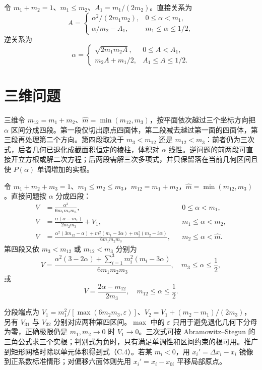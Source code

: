 \documentclass[11pt,a4paper,openany,fontset=none]{ctexbook}
\begin{document}
令 $m_1+m_2=1$、$m_1\le m_2$、$A_1=m_1/(2m_2)$。直接关系为
\begin{equation*}
 A=\begin{cases}
 \alpha^2/(2m_1m_2),&0\le\alpha<m_1,\\
 \alpha/m_2-A_1,&m_1\le\alpha\le1/2,
 \end{cases}
\end{equation*}
逆关系为
\begin{equation*}
 \alpha=\begin{cases}
 \sqrt{2m_1m_2A},&0\le A<A_1,\\
 m_2A+m_1/2,&A_1\le A\le1/2.
 \end{cases}
\end{equation*}

\section{三维问题}
三维令 $m_{12}=m_1+m_2$、$\widehat m=\min(m_{12},m_3)$，按平面依次越过三个坐标方向把 $\alpha$ 区间分成四段。第一段仅切出原点四面体，第二段减去越过第一面的四面体，第三段再处理第二个方向。第四段取决于 $m_3<m_{12}$ 还是 $m_{12}<m_3$：前者仍为三次式，后者几何已退化成截面积恒定的棱柱，体积对 $\alpha$ 线性。逆问题的前两段可直接开立方根或解二次方程；后两段需解三次多项式，并只保留落在当前几何区间且使 $P(\alpha)$ 单调增加的实根。


令 $m_1+m_2+m_3=1$、$m_1\le m_2\le m_3$，$m_{12}=m_1+m_2$，$\widehat m=\min(m_{12},m_3)$。直接问题按 $\alpha$ 分成四段：
\begin{align}
 V&=\frac{\alpha^3}{6m_1m_2m_3},&&0\le\alpha<m_1,\\
 V&=\frac{\alpha(\alpha-m_1)}{2m_2m_3}+V_1,&&m_1\le\alpha<m_2,\\
 V&=\frac{\alpha^2(3m_{12}-\alpha)+m_1^2(m_1-3\alpha)+m_2^2(m_2-3\alpha)}{6m_1m_2m_3},
 &&m_2\le\alpha<\widehat m.
\end{align}
第四段又依 $m_3<m_{12}$ 或 $m_{12}<m_3$ 分别为
\begin{equation*}
 V=\frac{\alpha^2(3-2\alpha)+\sum_{i=1}^3m_i^2(m_i-3\alpha)}{6m_1m_2m_3},
 \quad m_3\le\alpha\le\frac12,
\end{equation*}
或
\begin{equation*}
 V=\frac{2\alpha-m_{12}}{2m_3},
 \quad m_{12}\le\alpha\le\frac12.
\end{equation*}

分段端点为 $V_1=m_1^2/[\max(6m_2m_3,\varepsilon)]$、$V_2=V_1+(m_2-m_1)/(2m_3)$，另有 $V_{31}$ 与 $V_{32}$ 分别对应两种第四区间。$\max$ 中的 $\varepsilon$ 只用于避免退化几何下分母为零，正确极限仍是 $m_1,m_2\to0$ 时 $V_1\to0$。三次式可按 Abramowitz--Stegun 的三角公式求三个实根；判别式为负时，只有满足单调性和区间约束的根可用。推广到矩形网格时除以单元体积得到式（C.4）。若某 $m_i<0$，用 $x_i'=\Delta x_i-x_i$ 镜像到正系数标准情形；对偏移六面体则先用 $x_i'=x_i-x_{0i}$ 平移局部原点。
\end{document}

